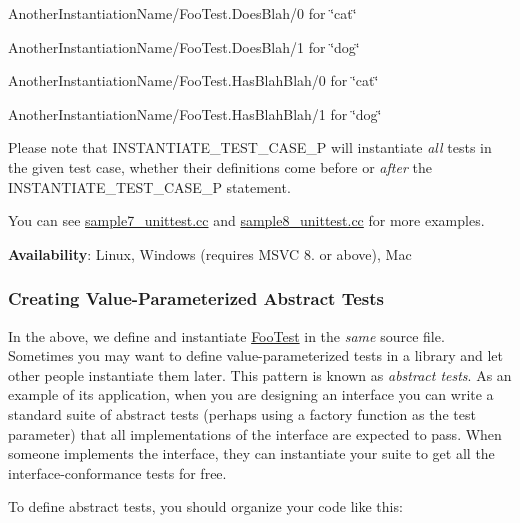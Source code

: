 \begin{DoxyItemize}
\item {\ttfamily Another\+Instantiation\+Name/\+Foo\+Test.\+Does\+Blah/0} for {\ttfamily \char`\"{}cat\char`\"{}}
\item {\ttfamily Another\+Instantiation\+Name/\+Foo\+Test.\+Does\+Blah/1} for {\ttfamily \char`\"{}dog\char`\"{}}
\item {\ttfamily Another\+Instantiation\+Name/\+Foo\+Test.\+Has\+Blah\+Blah/0} for {\ttfamily \char`\"{}cat\char`\"{}}
\item {\ttfamily Another\+Instantiation\+Name/\+Foo\+Test.\+Has\+Blah\+Blah/1} for {\ttfamily \char`\"{}dog\char`\"{}}
\end{DoxyItemize}

Please note that {\ttfamily I\+N\+S\+T\+A\+N\+T\+I\+A\+T\+E\+\_\+\+T\+E\+S\+T\+\_\+\+C\+A\+S\+E\+\_\+P} will instantiate {\itshape all} tests in the given test case, whether their definitions come before or {\itshape after} the {\ttfamily I\+N\+S\+T\+A\+N\+T\+I\+A\+T\+E\+\_\+\+T\+E\+S\+T\+\_\+\+C\+A\+S\+E\+\_\+P} statement.

You can see \mbox{\hyperlink{sample7__unittest_8cc}{sample7\+\_\+unittest.\+cc}} and \mbox{\hyperlink{sample8__unittest_8cc}{sample8\+\_\+unittest.\+cc}} for more examples.

{\bfseries{Availability}}\+: Linux, Windows (requires M\+S\+VC 8. or above), Mac

\subsubsection*{Creating Value-\/\+Parameterized Abstract Tests}

In the above, we define and instantiate {\ttfamily \mbox{\hyperlink{classFooTest}{Foo\+Test}}} in the {\itshape same} source file. Sometimes you may want to define value-\/parameterized tests in a library and let other people instantiate them later. This pattern is known as {\itshape abstract tests}. As an example of its application, when you are designing an interface you can write a standard suite of abstract tests (perhaps using a factory function as the test parameter) that all implementations of the interface are expected to pass. When someone implements the interface, they can instantiate your suite to get all the interface-\/conformance tests for free.

To define abstract tests, you should organize your code like this\+:


